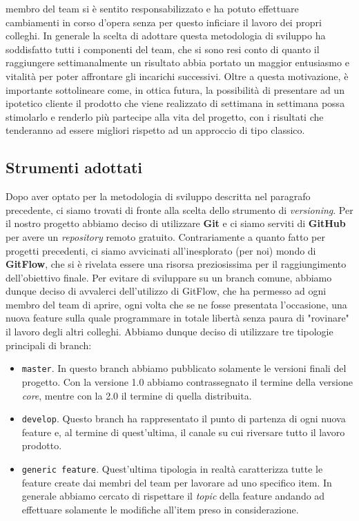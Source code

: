 membro del team si è sentito responsabilizzato e ha potuto effettuare cambiamenti in corso d'opera senza per questo inficiare il lavoro dei propri colleghi. In generale la scelta di adottare questa metodologia di sviluppo ha soddisfatto tutti i componenti del team, che si sono resi conto di quanto il raggiungere settimanalmente un risultato abbia portato un maggior entusiasmo e vitalità per poter affrontare gli incarichi successivi. Oltre a questa motivazione, è importante sottolineare come, in ottica futura, la possibilità di presentare ad un ipotetico cliente il prodotto che viene realizzato di settimana in settimana possa stimolarlo e renderlo più partecipe alla vita del progetto, con i risultati che tenderanno ad essere migliori rispetto ad un approccio di tipo classico.


        \subsection {Strumenti adottati}\label{subsec:tools}
Dopo aver optato per la metodologia di sviluppo descritta nel paragrafo precedente, ci siamo trovati di fronte alla scelta dello strumento di \textit{versioning}. Per il nostro progetto abbiamo deciso di utilizzare \textbf{Git} e ci siamo serviti di \textbf{GitHub} per avere un \textit{repository} remoto gratuito. Contrariamente a quanto fatto per progetti precedenti, ci siamo avvicinati all'inesplorato (per noi) mondo di \textbf{GitFlow}, che si è rivelata essere una risorsa preziosissima per il raggiungimento dell'obiettivo finale. Per evitare di sviluppare su un branch comune, abbiamo dunque deciso di avvalerci dell'utilizzo di GitFlow, che ha permesso ad ogni membro del team di aprire, ogni volta che se ne fosse presentata l'occasione, una nuova feature sulla quale programmare in totale libertà senza paura di "rovinare" il lavoro degli altri colleghi. Abbiamo dunque deciso di utilizzare tre tipologie principali di branch:
\begin{itemize}
\item \texttt{master}. In questo branch abbiamo pubblicato solamente le versioni finali del progetto. Con la versione 1.0 abbiamo contrassegnato il termine della versione \textit{core}, mentre con la 2.0 il termine di quella distribuita.
\item \texttt{develop}. Questo branch ha rappresentato il punto di partenza di ogni nuova feature e, al termine di quest'ultima, il canale su cui riversare tutto il lavoro prodotto.
\item  \texttt{generic feature}. Quest'ultima tipologia in realtà caratterizza tutte le feature create dai membri del team per lavorare ad uno specifico item. In generale abbiamo cercato di rispettare il \textit{topic} della feature andando ad effettuare solamente le modifiche all'item preso in considerazione.
\end{itemize}
